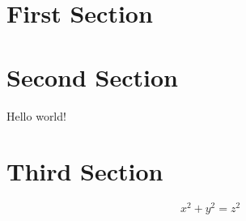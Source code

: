 

\renewcommand\TITLE{Testing myarticle.sty}


\topmatter

\section{First Section}
\lipsum[1-2]

\section{Second Section}
\lipsum[3]
\begin{console}
Hello world!
\end{console}
\lipsum[4-5]

\section{Third Section}
\lipsum[6]

\begin{thm}
\lipsum[7]
\[
x^2 + y^2 = z^2
\]
\lipsum[8]
\end{thm}

\lipsum[9-10]


